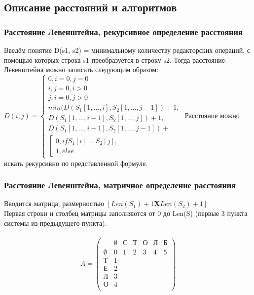 \documentclass[12pt,a4paper]{article}
\begin{document}
\subsection{Описание расстояний и алгоритмов}

\subsubsection{Расстояние Левенштейна, рекурсивное определение расстояния}
Введём понятие D(s1, s2) = минимальному количеству редакторских операций, с помощью которых строка s1 преобразуется в строку s2.
Тогда расстояние Левенштейна можно записать следующим образом:\\
$
D(i, j) = \begin{cases}
	0, i = 0, j = 0 \\
	i, j = 0, i > 0 \\
	j, i = 0, j > 0 \\
	min(D(S_{1}[1, ..., i], S_{2}[1, ..., j - 1]) + 1,\\
	D(S_{1}[1, ..., i - 1], S_{2}[1, ..., j]) + 1,\\
	D(S_{1}[1, ..., i - 1], S_{2}[1, ..., j - 1]) + \\
	\left[
	\begin{gathered}
	0, if S_{1}[i] = S_{2}[j],\\
	1, else
	\end{gathered}
	\right.
\end{cases}
$
Расстояние можно искать рекурсивно по представленной формуле.

\subsubsection{Расстояние Левенштейна, матричное определение расстояния}
Вводится матрица, размерностью $[Len(S_{1}) + 1 \textbf{X} Len(S_{2}) + 1]$\\
Первая строки и столбец матрицы заполняются от 0 до Len(S) (первые 3 пункта системы из предыдущего пункта).\\
\\
\begin{equation*}
A = \left(
\begin{array}{ccccccc}
 & \emptyset & \text{С} & \text{Т} & \text{О} & \text{Л} & \text{Б}\\
\emptyset & 0 & 1 & 2 & 3 & 4 & 5\\
\text{Т} & 1 & & & & & \\ 
\text{Е} & 2 & & & & & \\
\text{Л} & 3 & & & & & \\
\text{О} & 4 & & & & & \\
\end{array}
\right)
\end{equation*}
\end{document}
